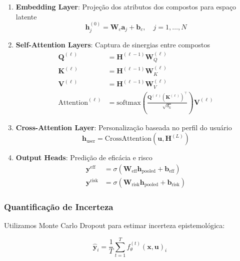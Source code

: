 \documentclass[12pt, a4paper]{article}
\begin{document}
\begin{enumerate}
    \item \textbf{Embedding Layer}: Projeção dos atributos dos compostos para espaço latente
    \begin{equation}
    \mathbf{h}_j^{(0)} = \mathbf{W}_c \mathbf{a}_j + \mathbf{b}_c, \quad j = 1,\ldots,N
    \end{equation}
    
    \item \textbf{Self-Attention Layers}: Captura de sinergias entre compostos
    \begin{align}
    \mathbf{Q}^{(\ell)} &= \mathbf{H}^{(\ell-1)} \mathbf{W}_Q^{(\ell)} \\
    \mathbf{K}^{(\ell)} &= \mathbf{H}^{(\ell-1)} \mathbf{W}_K^{(\ell)} \\
    \mathbf{V}^{(\ell)} &= \mathbf{H}^{(\ell-1)} \mathbf{W}_V^{(\ell)} \\
    \text{Attention}^{(\ell)} &= \text{softmax}\left(\frac{\mathbf{Q}^{(\ell)} (\mathbf{K}^{(\ell)})^\top}{\sqrt{d_k}}\right) \mathbf{V}^{(\ell)}
    \end{align}
    
    \item \textbf{Cross-Attention Layer}: Personalização baseada no perfil do usuário
    \begin{equation}
    \mathbf{h}_{\text{user}} = \text{CrossAttention}(\mathbf{u}, \mathbf{H}^{(L)})
    \end{equation}
    
    \item \textbf{Output Heads}: Predição de eficácia e risco
    \begin{align}
    \mathbf{y}^{\text{eff}} &= \sigma(\mathbf{W}_{\text{eff}} \mathbf{h}_{\text{pooled}} + \mathbf{b}_{\text{eff}}) \\
    \mathbf{y}^{\text{risk}} &= \sigma(\mathbf{W}_{\text{risk}} \mathbf{h}_{\text{pooled}} + \mathbf{b}_{\text{risk}})
    \end{align}
\end{enumerate}

\subsubsection{Quantificação de Incerteza}

Utilizamos Monte Carlo Dropout para estimar incerteza epistemológica:

\begin{equation}
\hat{\mathbf{y}}_i = \frac{1}{T} \sum_{t=1}^T f_\theta^{(t)}(\mathbf{x}, \mathbf{u})_i
\end{equation}
\end{document}
